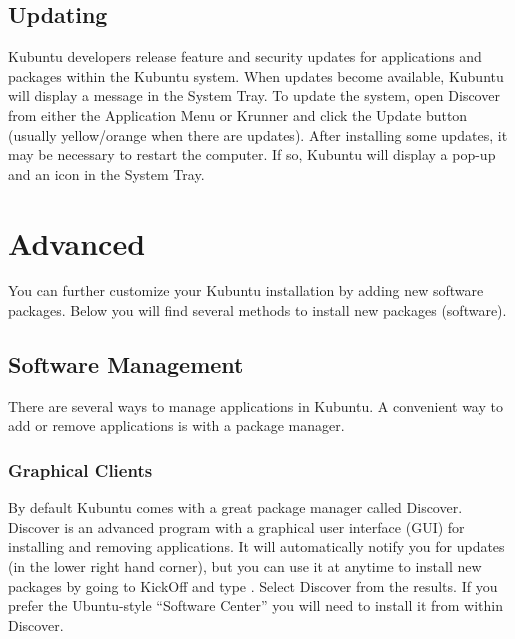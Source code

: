 \documentclass[letterpaper,10pt,english]{sphinxmanual}
\begin{document}
\section{Updating}
\label{\detokenize{docs/basic:updating}}
Kubuntu developers release feature and security updates for applications and packages within the Kubuntu system. When updates become available, Kubuntu will display a message in the System Tray. To update the system, open Discover from either the Application Menu or Krunner and click the Update button (usually yellow/orange when there are updates). After installing some updates, it may be necessary to restart the computer. If so, Kubuntu will display a pop-up and an icon in the System Tray.

\noindent{}

{\hyperref[\detokenize{docs/basic:basic}]{}}


\chapter{Advanced}
\label{\detokenize{docs/advanced::doc}}\label{\detokenize{docs/advanced:advanced}}\label{\detokenize{docs/advanced:advanced-link}}
You can further customize your Kubuntu installation by adding new software packages. Below you will find several methods to install new packages (software).


\section{Software Management}
\label{\detokenize{docs/advanced:software-management}}
There are several ways to manage applications in Kubuntu. A convenient way to add or remove applications is with a package manager.


\subsection{Graphical Clients}
\label{\detokenize{docs/advanced:graphical-clients}}
By default Kubuntu comes with a great package manager called Discover. Discover is an advanced program with a graphical user interface (GUI) for installing and removing applications. It will automatically notify you for updates (in the lower right hand corner), but you can use it at anytime to install new packages by going to KickOff and type . Select  Discover from the results. If you prefer the Ubuntu-style ``Software Center'' you will need to install it from within Discover.
\end{document}
